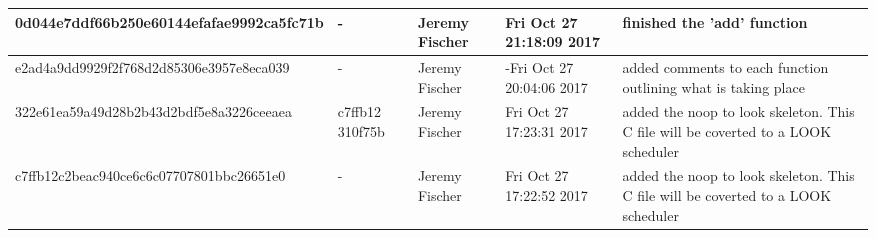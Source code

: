 \documentclass[draftclsnofoot, onecolumn, 10pt, compsoc]{IEEEtran}
\begin{document}
\begin{tabular}{| p{6.8cm} | p{1.3cm} | p{2.5cm} | p{2cm} | p{4.2cm} |}
			0d044e7ddf66b250e60144efafae9992ca5fc71b
			& -
			& Jeremy Fischer
			& Fri Oct 27 21:18:09 2017
    			& finished the 'add' function \\
			\hline

			e2ad4a9dd9929f2f768d2d85306e3957e8eca039
			& -
			& Jeremy Fischer
			& -Fri Oct 27 20:04:06 2017
			& added comments to each function outlining what is taking place \\
			\hline

			322e61ea59a49d28b2b43d2bdf5e8a3226ceeaea
			& c7ffb12 310f75b
			& Jeremy Fischer
			& Fri Oct 27 17:23:31 2017
			& added the noop to look skeleton. This C file will be coverted to a LOOK scheduler \\
			\hline

			c7ffb12c2beac940ce6c6c07707801bbc26651e0
			& -
			& Jeremy Fischer
			& Fri Oct 27 17:22:52 2017
			& added the noop to look skeleton. This C file will be coverted to a LOOK scheduler \\
			\hline
		\end{tabular}
\end{document}
